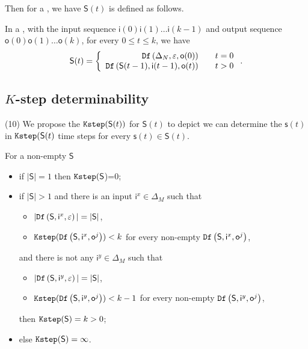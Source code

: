  Then for a \BCN, we have $\mathsf{S}(t)$ is defined as follows.
 \begin{definition}[$\mathsf{S}(t)$] In a \BCN, with the input sequence $\mathsf{i}(0)\mathsf{i}(1)\ldots\mathsf{i}(k-1)$ and output sequence $\mathsf{o}(0)\mathsf{o}(1)\ldots\mathsf{o}(k)$, for every $0\le t\le k$, we have
	\[\mathsf{S}(t)=\left\{
\begin{array}{rcl}
{\tt Df}\left(\Delta_N,\varepsilon,\mathsf{o}(0)\right)      &      & {t=0}\\
{\tt Df}\left(\mathsf{S}(t-1),\mathsf{i}(t-1),\mathsf{o}(t)\right)       &      & {t>0}
\end{array} \right. .\]

\end{definition}
 
 
\subsection{$K$-step determinability}
{\color{red} (10)} We propose the ${\tt Kstep}(\mathsf{S}(t))$ for $\mathsf{S}(t)$ to depict we can determine the $\mathsf{s}(t)$ in ${\tt Kstep}(\mathsf{S}(t)$ time steps for every $\mathsf{s}(t)\in \mathsf{S}(t)$. 
\begin{definition}[$\Ks(\mathsf{S})$] 
For a non-empty $\mathsf{S}$
 \begin{itemize}
 \item   if $|\mathsf{S}|=1$ then ${\tt Kstep}(\mathsf{S}$)=0;
 \item  if $|\mathsf{S}|>1$ and there is an input $\mathsf{i}^{x} \in \Delta_M$ such that
 \begin{itemize}
 \item  $|{\tt Df}\left(\mathsf{S},\mathsf{i}^{x},\varepsilon\right)|=|\mathsf{S}|$,
 \item  ${\tt Kstep}({\tt Df}\left(\mathsf{S},\mathsf{i}^{x},\mathsf{o}^{j}\right))< k$ for every non-empty ${\tt Df}\left(\mathsf{S},\mathsf{i}^{x},\mathsf{o}^{j}\right)$,
 \end{itemize} 
 and there is not any $\mathsf{i}^{y} \in \Delta_M$ such that
  \begin{itemize}
 \item  $|{\tt Df}\left(\mathsf{S},\mathsf{i}^{y},\varepsilon\right)|=|\mathsf{S}|$,
 \item  ${\tt Kstep}({\tt Df}\left(\mathsf{S},\mathsf{i}^{y},\mathsf{o}^{j}\right))< k-1$ for every non-empty ${\tt Df}\left(\mathsf{S},\mathsf{i}^{y},\mathsf{o}^{j}\right)$,
 \end{itemize} 
then ${\tt Kstep}(\mathsf{S})=k>0$;%
 \item else ${\tt Kstep}(\mathsf{S})=\infty$.
 \end{itemize}
\end{definition}

